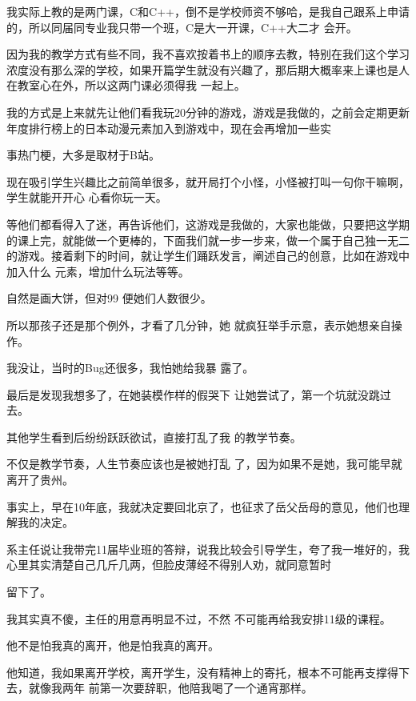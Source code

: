\documentclass{article}
\begin{document}
我实际上教的是两门课，C和C++，倒不是学校师资不够哈，是我自己跟系上申请的，所以同届同专业我只带一个班，C是大一开课，C++大二才
会开。 

因为我的教学方式有些不同，我不喜欢按着书上的顺序去教，特别在我们这个学习浓度没有那么深的学校，如果开篇学生就没有兴趣了，那后期大概率来上课也是人在教室心在外，所以这两门课必须得我
一起上。 

我的方式是上来就先让他们看我玩20分钟的游戏，游戏是我做的，之前会定期更新年度排行榜上的日本动漫元素加入到游戏中，现在会再增加一些实

\newpage
事热门梗，大多是取材于B站。 

现在吸引学生兴趣比之前简单很多，就开局打个小怪，小怪被打叫一句你干嘛啊，学生就能开开心
心看你玩一天。 

等他们都看得入了迷，再告诉他们，这游戏是我做的，大家也能做，只要把这学期的课上完，就能做一个更棒的，下面我们就一步一步来，做一个属于自己独一无二的游戏。接着剩下的时间，就让学生们踊跃发言，阐述自己的创意，比如在游戏中加入什么
元素，增加什么玩法等等。 

自然是画大饼，但对99%
便她们人数很少。 

所以那孩子还是那个例外，才看了几分钟，她
就疯狂举手示意，表示她想亲自操作。 

\newpage

我没让，当时的Bug还很多，我怕她给我暴
露了。 

最后是发现我想多了，在她装模作样的假哭下
让她尝试了，第一个坑就没跳过去。 

其他学生看到后纷纷跃跃欲试，直接打乱了我
的教学节奏。 

不仅是教学节奏，人生节奏应该也是被她打乱
了，因为如果不是她，我可能早就离开了贵州。 


事实上，早在10年底，我就决定要回北京了，也征求了岳父岳母的意见，他们也理解我的决定。
 

系主任说让我带完11届毕业班的答辩，说我比较会引导学生，夸了我一堆好的，我心里其实清楚自己几斤几两，但脸皮薄经不得别人劝，就同意暂时

\newpage
留下了。 

我其实真不傻，主任的用意再明显不过，不然
不可能再给我安排11级的课程。 


他不是怕我真的离开，他是怕我真的离开。 

他知道，我如果离开学校，离开学生，没有精神上的寄托，根本不可能再支撑得下去，就像我两年
前第一次要辞职，他陪我喝了一个通宵那样。 
\end{document}
